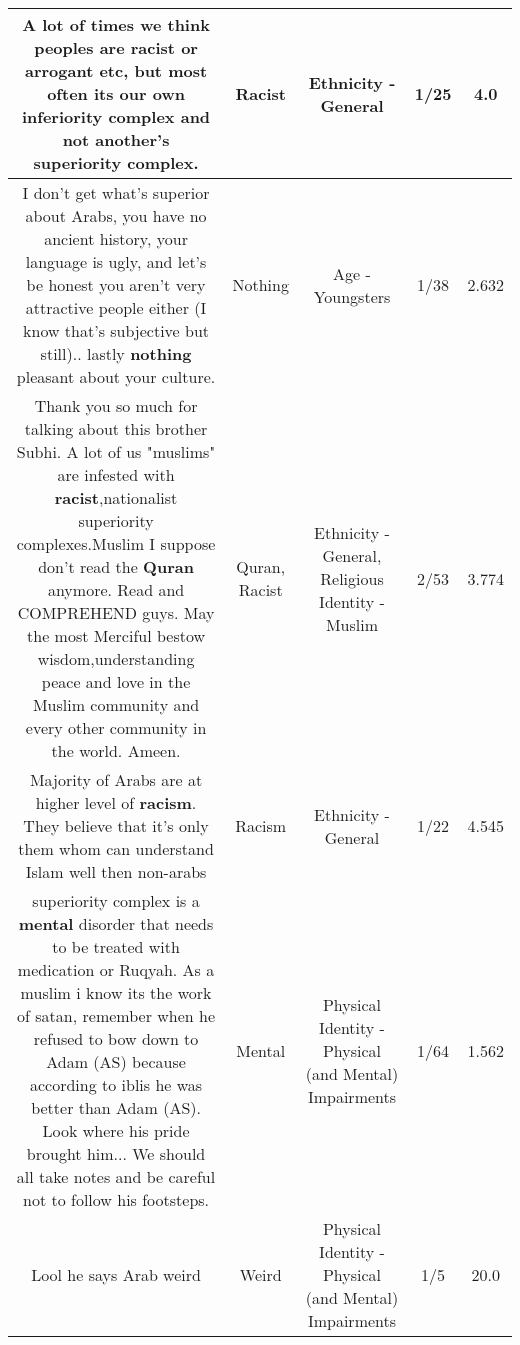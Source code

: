 \documentclass[11pt]{article}
\newlength\mylength
\begin{document}
\begin{center}
\begin{longtable}{|C{.65\mylength}|C{.30\mylength}|C{.12\mylength}|C{.12\mylength}|C{.12\mylength}|}
  \small A lot of times we think peoples are \textbf{racist} or arrogant etc,  but most often its our own inferiority complex and not another's superiority complex.\normalsize   & Racist & Ethnicity - General & 1/25 & 4.0 \\  \hline
  \small I️ don't get what's superior about Arabs, you have no ancient history, your language is ugly, and let's be honest you aren't very attractive people either (I️ know that's subjective but still).. lastly \textbf{nothing} pleasant about your culture.\normalsize   & Nothing & Age - Youngsters & 1/38 & 2.632 \\  \hline
  \small Thank you so much for talking about this brother Subhi. A lot of us "muslims"  are infested with \textbf{racist},nationalist superiority complexes.Muslim I suppose don't read the \textbf{Quran} anymore. Read and COMPREHEND guys.  May the most Merciful bestow wisdom,understanding peace and love in the Muslim community and every other community in the world. Ameen.\normalsize   & Quran, Racist & Ethnicity - General, Religious Identity - Muslim & 2/53 & 3.774 \\  \hline
  \small Majority of Arabs are at higher level of \textbf{racism}.  They believe that it's only them whom can understand Islam well then non-arabs\normalsize   & Racism & Ethnicity - General & 1/22 & 4.545 \\  \hline
  \small superiority complex is a \textbf{mental} disorder that needs to be treated with medication or Ruqyah. As a muslim i know its the work of satan, remember when he refused to bow down to Adam (AS) because according to iblis he was better than Adam (AS). Look where his pride brought him... We should all take notes and be careful not to follow his footsteps.\normalsize   & Mental & Physical Identity - Physical (and Mental) Impairments & 1/64 & 1.562 \\  \hline
  \small Lool he says Arab weird\normalsize   & Weird & Physical Identity - Physical (and Mental) Impairments & 1/5 & 20.0 \\  \hline

\end{longtable}
\end{center}
\end{document}
